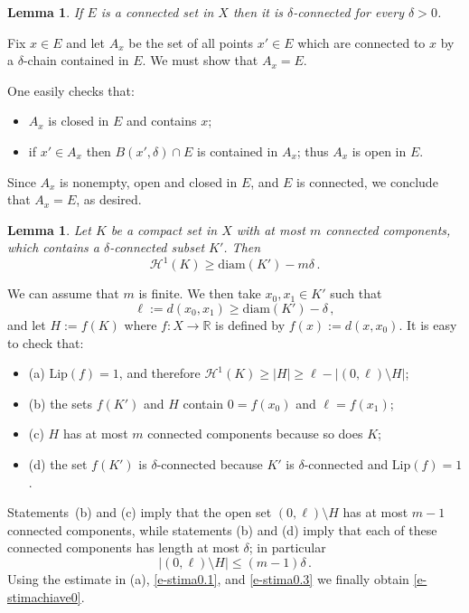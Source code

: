 \documentclass[11pt,reqno,a4paper,final]{amsart}
\makeatletter
\numberwithin{equation}{section}
\theoremstyle{mytheorem}
\newtheorem{lemma}[subsection]{Lemma}
\theoremstyle{myremark}
\theoremstyle{myparagraph}
\renewenvironment{proof}[1][\proofname]{\par 
  \pushQED{\qed}%
  \normalfont \topsep10\p@\@plus6\p@\relax 
  \trivlist 
  \item[\hskip\labelsep 
    \bfseries 
    #1\@addpunct{.}]\ignorespaces 
}{%
  \popQED\endtrivlist\@endpefalse 
}
\providecommand{\proofname}{Proof}
\newenvironment{itemizeb}
{\begin{itemize}\itemsep=2pt\leftskip -5 pt}
{\end{itemize}}
\newcommand{\R}{\mathbb{R}}
\newcommand{\Haus}{\mathscr{H}}
\newcommand{\diam}{\mathrm{diam}}
\newcommand{\Lip}{\mathrm{Lip}}
\makeatother
\begin{document}
\begin{lemma}
\label{s-deltaconn}
If $E$ is a connected set in $X$ then it is $\delta$-connected
for every $\delta>0$. 
\end{lemma}

\begin{proof}
Fix $x\in E$ and let $A_x$
be the set of all points $x'\in E$ which are connected
to $x$ by a $\delta$-chain contained in $E$. We must show that $A_x=E$.

One easily checks that:
%
\begin{itemizeb}
\item
$A_x$ is closed in $E$ and contains $x$; 
\item
if $x' \in A_x$ then $B(x',\delta)\cap E$ is contained in $A_x$;
thus $A_x$ is open in $E$.
\end{itemizeb}
%
Since $A_x$ is nonempty, open and closed in $E$, and $E$ is connected, 
we conclude that $A_x=E$, as desired.
\end{proof}


\begin{lemma}
\label{s-lemmachiave0}
Let $K$ be a compact set in $X$ with at most $m$ connected components,
which contains a $\delta$-connected subset $K'$.
Then 
%
\begin{equation}
\label{e-stimachiave0}
\Haus^1(K) \ge \diam(K') - m\delta
\, .
\end{equation}
%
\end{lemma}

\begin{proof}
We can assume that $m$ is finite.
We then take $x_0,x_1\in K'$ such that
%
\begin{equation}
\label{e-stima0.1}
\ell:=d(x_0,x_1) \ge \diam(K') - \delta
\, ,
\end{equation}
%
and let $H:=f(K)$ where $f:X\to\R$ is defined by 
$f(x):=d(x,x_0)$. It is easy to check that:
%
\begin{itemizeb}
\item[(a)]
$\Lip(f)=1$, and therefore
$\Haus^1(K) \ge |H| \ge \ell - \big| (0,\ell)\setminus H \big|$;
\item[(b)]
the sets $f(K')$ and $H$ contain $0=f(x_0)$ and $\ell=f(x_1)$;
\item[(c)]
$H$ has at most $m$ connected components because
so does $K$;
\item[(d)]
the set $f(K')$ is $\delta$-connected because $K'$ is 
$\delta$-connected and $\Lip(f)=1$.
\end{itemizeb}
%
Statements~(b) and (c) imply that the open set $(0,\ell)\setminus H$ 
has at most $m-1$ connected components, while statements 
(b) and (d) imply that each of these connected components 
has length at most $\delta$; in particular 
%
\begin{equation}
\label{e-stima0.3}
\big| (0,\ell)\setminus H \big| \le (m-1)\delta
\, .
\end{equation}
%
Using the estimate in (a), \eqref{e-stima0.1},
and \eqref{e-stima0.3} we finally obtain \eqref{e-stimachiave0}.
\end{proof}
\end{document}
